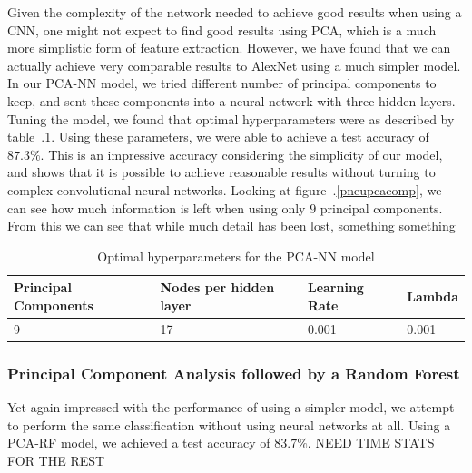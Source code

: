 \documentclass[onecolumn,10pt,cleanfoot]{asme2ej}
\begin{document}
Given the complexity of the network needed to achieve good results when using a CNN, one might not expect to find good results using PCA, which is a much more simplistic form of feature extraction. However, we have found that we can actually achieve very comparable results to AlexNet using a much simpler model. In our PCA-NN model, we tried different number of principal components to keep, and sent these components into a neural network with three hidden layers. Tuning the model, we found that optimal hyperparameters were as described by table~.\ref{pcanntable}. Using these parameters, we were able to achieve a test accuracy of $87.3\%$. This is an impressive accuracy considering the simplicity of our model, and shows that it is possible to achieve reasonable results without turning to complex convolutional neural networks. Looking at figure~.\ref{pneupcacomp}, we can see how much information is left when using only $9$ principal components. From this we can see that while much detail has been lost, something something

\begin{table}[H]
\caption{Optimal hyperparameters for the PCA-NN model}
\begin{center}
\label{pcanntable}
\begin{tabular}{| l | l | l | l |}
\hline
Principal Components & Nodes per hidden layer & Learning Rate & Lambda \\
\hline
9 & 17 & 0.001 & 0.001 \\
\hline
\end{tabular}
\end{center}
\end{table}


\subsubsection{Principal Component Analysis followed by a Random Forest}

Yet again impressed with the performance of using a simpler model, we attempt to perform the same classification without using neural networks at all. Using a PCA-RF model, we achieved a test accuracy of $83.7\%$. NEED TIME STATS FOR THE REST
\end{document}
